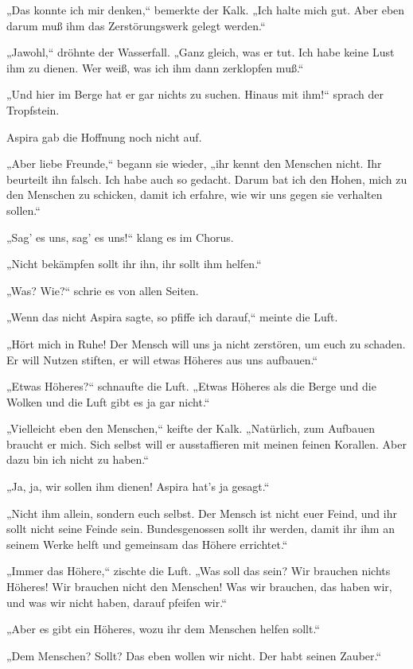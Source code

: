 „Das konnte ich mir denken,“ bemerkte der Kalk. „Ich halte mich
gut. Aber eben darum muß ihm das Zerstörungswerk gelegt werden.“

„Jawohl,“ dröhnte der Wasserfall. „Ganz gleich, was er tut. Ich
habe keine Lust ihm zu dienen. Wer weiß, was ich ihm dann
zerklopfen muß.“

„Und hier im Berge hat er gar nichts zu suchen. Hinaus mit ihm!“
sprach der Tropfstein.

Aspira gab die Hoffnung noch nicht auf.

„Aber liebe Freunde,“ begann sie wieder, „ihr kennt den Menschen
nicht. Ihr beurteilt ihn falsch. Ich habe auch so gedacht. Darum
bat ich den Hohen, mich zu den Menschen zu schicken, damit ich
erfahre, wie wir uns gegen sie verhalten sollen.“

„Sag' es uns, sag' es uns!“ klang es im Chorus.

„Nicht bekämpfen sollt ihr ihn, ihr sollt ihm helfen.“

„Was? Wie?“ schrie es von allen Seiten.

„Wenn das nicht Aspira sagte, so pfiffe ich darauf,“ meinte die
Luft.

„Hört mich in Ruhe! Der Mensch will uns ja nicht zerstören, um euch
zu schaden. Er will Nutzen stiften, er will etwas Höheres aus uns
aufbauen.“

„Etwas Höheres?“ schnaufte die Luft. „Etwas Höheres als die Berge
und die Wolken und die Luft gibt es ja gar nicht.“

„Vielleicht eben den Menschen,“ keifte der Kalk. „Natürlich, zum
Aufbauen braucht er mich. Sich selbst will er ausstaffieren mit
meinen feinen Korallen. Aber dazu bin ich nicht zu haben.“

„Ja, ja, wir sollen ihm dienen! Aspira hat's ja gesagt.“

„Nicht ihm allein, sondern euch selbst. Der Mensch ist nicht euer
Feind, und ihr sollt nicht seine Feinde sein. Bundesgenossen sollt
ihr werden, damit ihr ihm an seinem Werke helft und gemeinsam das
Höhere errichtet.“

„Immer das Höhere,“ zischte die Luft. „Was soll das sein? Wir
brauchen nichts Höheres! Wir brauchen nicht den Menschen! Was wir
brauchen, das haben wir, und was wir nicht haben, darauf pfeifen
wir.“

„Aber es gibt ein Höheres, wozu ihr dem Menschen helfen sollt.“

„Dem Menschen? Sollt? Das eben wollen wir nicht. Der habt seinen
Zauber.“

